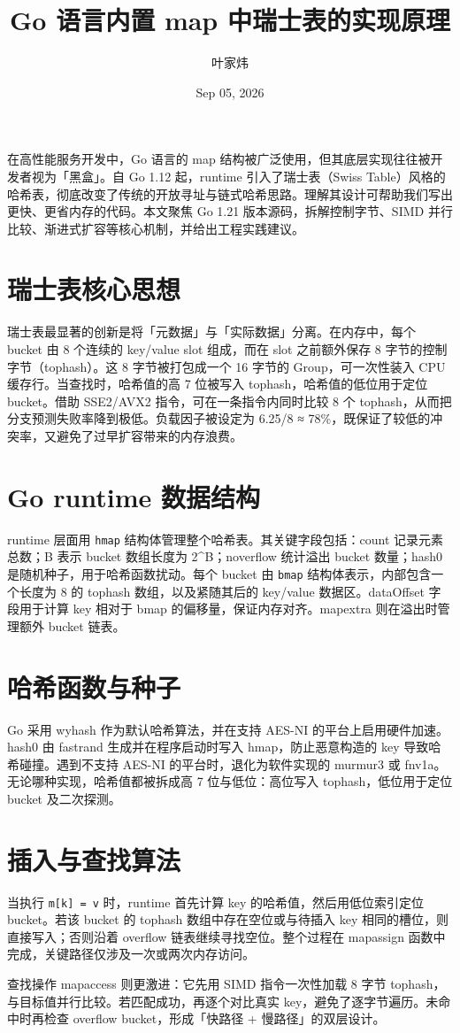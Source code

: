 \title{Go 语言内置 map 中瑞士表的实现原理}
\author{叶家炜}
\date{Sep 05, 2026}
\maketitle
在高性能服务开发中，Go 语言的 map 结构被广泛使用，但其底层实现往往被开发者视为「黑盒」。自 Go 1.12 起，runtime 引入了瑞士表（Swiss Table）风格的哈希表，彻底改变了传统的开放寻址与链式哈希思路。理解其设计可帮助我们写出更快、更省内存的代码。本文聚焦 Go 1.21 版本源码，拆解控制字节、SIMD 并行比较、渐进式扩容等核心机制，并给出工程实践建议。\par
\chapter{瑞士表核心思想}
瑞士表最显著的创新是将「元数据」与「实际数据」分离。在内存中，每个 bucket 由 8 个连续的 key/value slot 组成，而在 slot 之前额外保存 8 字节的控制字节（tophash）。这 8 字节被打包成一个 16 字节的 Group，可一次性装入 CPU 缓存行。当查找时，哈希值的高 7 位被写入 tophash，哈希值的低位用于定位 bucket。借助 SSE2/AVX2 指令，可在一条指令内同时比较 8 个 tophash，从而把分支预测失败率降到极低。负载因子被设定为 6.25/8 ≈ 78\%{}，既保证了较低的冲突率，又避免了过早扩容带来的内存浪费。\par
\chapter{Go runtime 数据结构}
runtime 层面用 \texttt{hmap} 结构体管理整个哈希表。其关键字段包括：count 记录元素总数；B 表示 bucket 数组长度为 2\^{}B；noverflow 统计溢出 bucket 数量；hash0 是随机种子，用于哈希函数扰动。每个 bucket 由 \texttt{bmap} 结构体表示，内部包含一个长度为 8 的 tophash 数组，以及紧随其后的 key/value 数据区。dataOffset 字段用于计算 key 相对于 bmap 的偏移量，保证内存对齐。mapextra 则在溢出时管理额外 bucket 链表。\par
\chapter{哈希函数与种子}
Go 采用 wyhash 作为默认哈希算法，并在支持 AES-NI 的平台上启用硬件加速。hash0 由 fastrand 生成并在程序启动时写入 hmap，防止恶意构造的 key 导致哈希碰撞。遇到不支持 AES-NI 的平台时，退化为软件实现的 murmur3 或 fnv1a。无论哪种实现，哈希值都被拆成高 7 位与低位：高位写入 tophash，低位用于定位 bucket 及二次探测。\par
\chapter{插入与查找算法}
当执行 \texttt{m[k] = v} 时，runtime 首先计算 key 的哈希值，然后用低位索引定位 bucket。若该 bucket 的 tophash 数组中存在空位或与待插入 key 相同的槽位，则直接写入；否则沿着 overflow 链表继续寻找空位。整个过程在 mapassign 函数中完成，关键路径仅涉及一次或两次内存访问。\par
查找操作 mapaccess 则更激进：它先用 SIMD 指令一次性加载 8 字节 tophash，与目标值并行比较。若匹配成功，再逐个对比真实 key，避免了逐字节遍历。未命中时再检查 overflow bucket，形成「快路径 + 慢路径」的双层设计。\par
